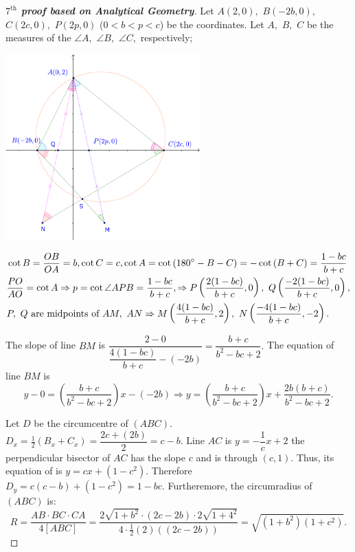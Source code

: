 \documentclass{article}
\begin{document}
\newpage

\begin{proof}[\textbf{$7^{\text{th}}$ proof based on Analytical Geometry}]
    Let $A(2,0),$ $B(-2b,0),$ $C(2c,0),$ $P(2p,0)$ ($0< b < p < c$) be the coordinates.
    Let $A,$ $B,$ $C$ be the measures of the $\angle A,$ $\angle B,$ $\angle C,$ respectively;
    \begin{center}
        \includegraphics[width=7.5cm]{./svg/pdf/ot-22-23-4-e2-s7.pdf}
    \end{center}
    \[
        \begin{aligned}
            &\cot{B} = \frac{OB}{OA} = b, \cot{C} = c, \cot{A} = \cot{(180^\circ-B-C)} = -\cot{(B+C)} = \frac{1-bc}{b+c}\\
            &\frac{PO}{AO} = \cot{A} \Rightarrow p = \cot{\angle APB} = \frac{1-bc}{b+c},
            \Rightarrow P \left( \frac{2(1-bc)}{b+c}, 0\right),\ Q \left(\frac{-2(1-bc)}{b+c}, 0\right),\\
            &P,\ Q \text { are midpoints of } AM,\ AN
            \Rightarrow M \left( \frac{4(1-bc)}{b+c}, 2\right),\ N \left( \frac{-4(1-bc)}{b+c}, -2\right).
        \end{aligned}
    \]
    
    The slope of line $BM$ is $\dfrac{2 - 0}{\dfrac{4(1-bc)}{b+c} - (-2b)} = \dfrac{b+c}{b^2-bc+2}.$
    The equation of line $BM$ is 
    \[
        y - 0 = \left( \frac{b+c}{b^2-bc+2} \right) x - (-2b)
        \Rightarrow y = \left( \frac{b+c}{b^2-bc+2} \right) x + \frac{2b(b+c)}{b^2-bc+2}.
    \]

    Let $D$ be the circumcentre of $(ABC).$ $D_x = \frac{1}{2}(B_x+C_x) =\dfrac{2c+(2b)}{2}=c-b.$
    Line $AC$ is $y=-\dfrac{1}{c}x+2$ the perpendicular bisector of $AC$ has the slope $c$ and
    is through $(c,1).$ Thus, its equation of is $y=cx+(1-c^2).$
    Therefore $D_y=c(c-b)+(1-c^2) = 1-bc.$
    Furtheremore, the circumradius of $(ABC)$ is:
    \[ 
        R = \frac{AB \cdot BC \cdot CA}{4[ABC]} = \frac{2\sqrt{1+b^2} \cdot (2c-2b) \cdot 2\sqrt{1+4^2} }{4 \cdot \frac{1}{2}(2)((2c-2b)) }
        = \sqrt{(1+b^2)(1+c^2)}.
    \]


\end{proof}
\end{document}
